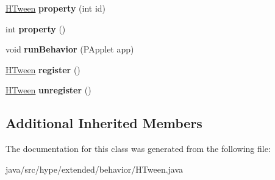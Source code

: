 \begin{DoxyCompactItemize}
\item 
\hypertarget{classhype_1_1extended_1_1behavior_1_1_h_tween_afdb301e13c11b7e8e024b92c5639d5a9}{\hyperlink{classhype_1_1extended_1_1behavior_1_1_h_tween}{H\-Tween} {\bfseries property} (int id)}\label{classhype_1_1extended_1_1behavior_1_1_h_tween_afdb301e13c11b7e8e024b92c5639d5a9}

\item 
\hypertarget{classhype_1_1extended_1_1behavior_1_1_h_tween_a9b25b9ae05d39970cb3ee85a537cf8f8}{int {\bfseries property} ()}\label{classhype_1_1extended_1_1behavior_1_1_h_tween_a9b25b9ae05d39970cb3ee85a537cf8f8}

\item 
\hypertarget{classhype_1_1extended_1_1behavior_1_1_h_tween_a328e3d3dd0ebcc0e7a7f9c56fbe1cd97}{void {\bfseries run\-Behavior} (P\-Applet app)}\label{classhype_1_1extended_1_1behavior_1_1_h_tween_a328e3d3dd0ebcc0e7a7f9c56fbe1cd97}

\item 
\hypertarget{classhype_1_1extended_1_1behavior_1_1_h_tween_a54496b6e6923ff194a94e130b3aeeded}{\hyperlink{classhype_1_1extended_1_1behavior_1_1_h_tween}{H\-Tween} {\bfseries register} ()}\label{classhype_1_1extended_1_1behavior_1_1_h_tween_a54496b6e6923ff194a94e130b3aeeded}

\item 
\hypertarget{classhype_1_1extended_1_1behavior_1_1_h_tween_a9655b58a402c97e33d7474909cf585a8}{\hyperlink{classhype_1_1extended_1_1behavior_1_1_h_tween}{H\-Tween} {\bfseries unregister} ()}\label{classhype_1_1extended_1_1behavior_1_1_h_tween_a9655b58a402c97e33d7474909cf585a8}

\end{DoxyCompactItemize}
\subsection*{Additional Inherited Members}


The documentation for this class was generated from the following file\-:\begin{DoxyCompactItemize}
\item 
java/src/hype/extended/behavior/H\-Tween.\-java\end{DoxyCompactItemize}
